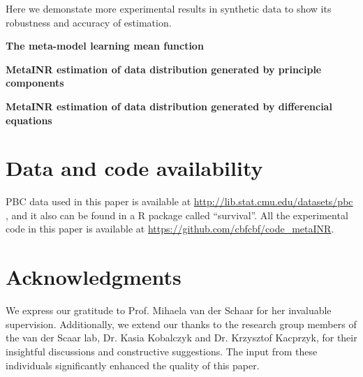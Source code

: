 \documentclass{article}
\begin{document}
Here we demonstate more experimental results in synthetic data to show its robustness and accuracy of estimation.

\textbf{The meta-model learning mean function} %

\textbf{MetaINR estimation of data distribution generated by principle components}

\textbf{MetaINR estimation of data distribution generated by differencial equations} %


\section*{Data and code availability}
PBC data used in this paper is available at \url{http://lib.stat.cmu.edu/datasets/pbc} , and it also can be found in a R package called ``survival''.
All the experimental code in this paper is available at \url{https://github.com/cbfcbf/code\_metaINR}.

\section*{Acknowledgments}
We express our gratitude to Prof. Mihaela van der Schaar for her invaluable supervision. 
Additionally, we extend our thanks to the research group members of the van der Scaar lab, Dr. Kasia Kobalczyk and Dr. Krzysztof Kacprzyk, for their insightful discussions and constructive suggestions. 
The input from these individuals significantly enhanced the quality of this paper.





\end{document}
